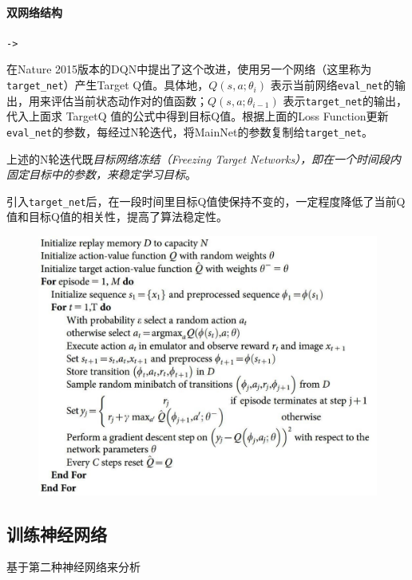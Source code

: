 \documentclass[UTF8,a4paper,12pt]{ctexbook}
\begin{document}
			\paragraph{双网络结构}
				\verb|->|
				
				在Nature 2015版本的DQN中提出了这个改进，使用另一个网络（这里称为\verb|target_net|）产生Target Q值。具体地，$Q(s,a;\theta_i)$ 表示当前网络\verb|eval_net|的输出，用来评估当前状态动作对的值函数；$Q(s,a;\theta_{i-1})$ 表示\verb|target_net|的输出，代入上面求 TargetQ 值的公式中得到目标Q值。根据上面的Loss Function更新\verb|eval_net|的参数，每经过N轮迭代，将MainNet的参数复制给\verb|target_net|。
				
				上述的N轮迭代既\textit{目标网络冻结（Freezing Target Networks），即在一个时间段内固定目标中的参数，来稳定学习目标}。
				
				引入\verb|target_net|后，在一段时间里目标Q值使保持不变的，一定程度降低了当前Q值和目标Q值的相关性，提高了算法稳定性。

				\begin{figure}[H]
					\centering
					\includegraphics[width=.9\linewidth]{DQN7}
				\end{figure}
							
		\subsection{训练神经网络}
			基于第二种神经网络来分析
			
\end{document}
